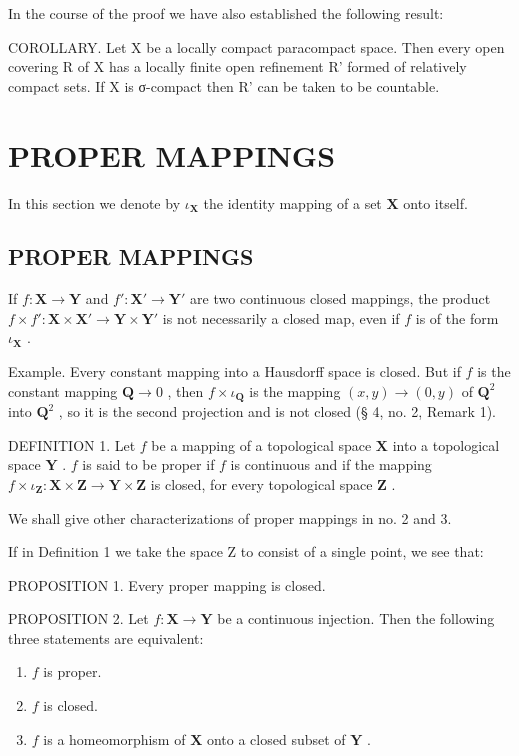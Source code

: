 In the course of the proof we have also established the following result:

COROLLARY. Let X be a locally compact paracompact space. Then every open covering R of X has a locally finite open refinement R' formed of relatively compact sets. If X is σ-compact then R' can be taken to be countable.

\section{PROPER MAPPINGS}

In this section we denote by \(\iota_{\mathbf{X}}\) the identity mapping of a set \(\mathbf{X}\) onto itself.

\subsection{PROPER MAPPINGS}

If \(f: \mathbf{X} \to \mathbf{Y}\) and \(f': \mathbf{X}' \to \mathbf{Y}'\) are two continuous closed mappings, the product \(f \times f': \mathbf{X} \times \mathbf{X}' \to \mathbf{Y} \times \mathbf{Y}'\) is not necessarily a closed map, even if \(f\) is of the form \(\iota_{\mathbf{X}}\) .

Example. Every constant mapping into a Hausdorff space is closed. But if \(f\) is the constant mapping \(\mathbf{Q} \to 0\) , then \(f \times \iota_{\mathbf{Q}}\) is the mapping \((x, y) \to (0, y)\) of \(\mathbf{Q}^2\) into \(\mathbf{Q}^2\) , so it is the second projection and is not closed (§ 4, no. 2, Remark 1).

DEFINITION 1. Let \(f\) be a mapping of a topological space \(\mathbf{X}\) into a topological space \(\mathbf{Y}\) . \(f\) is said to be proper if \(f\) is continuous and if the mapping \(f \times \iota_{\mathbf{Z}} : \mathbf{X} \times \mathbf{Z} \to \mathbf{Y} \times \mathbf{Z}\) is closed, for every topological space \(\mathbf{Z}\) .

We shall give other characterizations of proper mappings in no. 2 and 3.

If in Definition 1 we take the space Z to consist of a single point, we see that:

PROPOSITION 1. Every proper mapping is closed.

PROPOSITION 2. Let \(f: \mathbf{X} \to \mathbf{Y}\) be a continuous injection. Then the following three statements are equivalent:

\begin{enumerate}
\def\labelenumi{\alph{enumi})}
\item
  \(f\) is proper.
\item
  \(f\) is closed.
\item
  \(f\) is a homeomorphism of \(\mathbf{X}\) onto a closed subset of \(\mathbf{Y}\) .
\end{enumerate}


